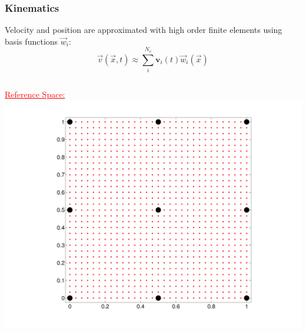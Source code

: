 \documentclass[notes=hide,8pt,xcolor=svgnames]{beamer}
\begin{document}
\begin{frame}[fragile]
\frametitle{Kinematics}
\small
 Velocity and position are approximated with high order finite elements using
basis functions $\vec w_i$:
$$
\vec{v}(\vec{x},t)\approx \displaystyle\sum_i^{N_v} \mathbf{v}_i(t) \vec w_i(\vec{x})
$$
\begin{center}
\begin{minipage}{0.7\textwidth}
 \begin{columns}
  \begin{column}{0.3\textwidth}
  \centering
  \small
  \textcolor{red}{\underline{Reference Space:}}
    \includegraphics[width=1.0\textwidth,keepaspectratio=true,viewport=200 50
900 775]{figures/Q2_Element_Ref.pdf}
  \end{column}
\end{columns}
\end{minipage}
\end{center}
\end{frame}
\end{document}
